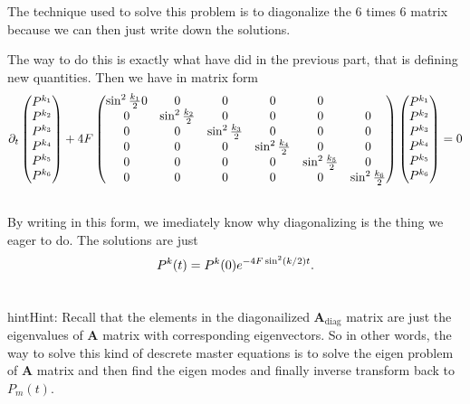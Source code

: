 \documentclass[letterpaper,10pt,english]{sphinxmanual}
\begin{document}
The technique used to solve this problem is to diagonalize the 6 times 6 matrix because we can then just write down the solutions.

The way to do this is exactly what have did in the previous part, that is defining new quantities. Then we have in matrix form
\begin{gather}
\begin{split}\partial_t \begin{pmatrix} P^{k_1} \\ P^{k_2}\\ P^{k_3}\\ P^{k_4}\\ P^{k_5}\\ P^{k_6} \end{pmatrix} + 4F \begin{pmatrix} \sin^2\frac{k_1}{2} 0 & 0 & 0 & 0 & 0 \\ 0 &  \sin^2\frac{k_2}{2} & 0 & 0 & 0 & 0 \\ 0 & 0 &  \sin^2\frac{k_3}{2} & 0 & 0 & 0 \\ 0 & 0 & 0 & \sin^2\frac{k_4}{2} & 0 & 0 \\ 0 & 0 & 0 & 0 &  \sin^2\frac{k_5}{2} & 0 \\ 0 & 0 & 0 & 0 & 0 &  \sin^2\frac{k_6}{2}   \end{pmatrix} \begin{pmatrix} P^{k_1} \\ P^{k_2}\\ P^{k_3}\\ P^{k_4}\\ P^{k_5}\\ P^{k_6} \end{pmatrix} = 0\end{split}\notag\\\begin{split}\end{split}\notag
\end{gather}
By writing in this form, we imediately know why diagonalizing is the thing we eager to do. The solutions are just
\begin{gather}
\begin{split}P^k(t) = P^k(0) e^{-4F\sin^2(k/2) t} .\end{split}\notag\\\begin{split}\end{split}\notag
\end{gather}
\begin{notice}{hint}{Hint:}
Recall that the elements in the diagonailized $\mathbf A_{\text{diag}}$ matrix are just the eigenvalues of $\mathbf A$ matrix with corresponding eigenvectors. So in other words, the way to solve this kind of descrete master equations is to solve the eigen problem of $\mathbf A$ matrix and then find the eigen modes and finally inverse transform back to $P_m(t)$.
\end{notice}
\end{document}
